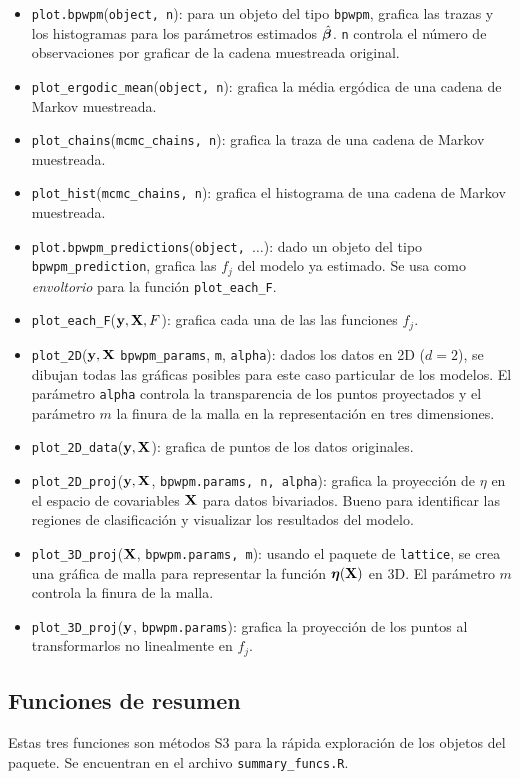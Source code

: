 \documentclass[../../Main/Main.tex]{subfiles}
\begin{document}
\begin{itemize}[label = {}]
	\item \verb|plot.bpwpm|(\verb|object, n|): para un objeto del tipo \verb|bpwpm|, grafica las trazas y los histogramas para los parámetros estimados $\hat{\bm{\beta}}$. \verb|n| controla el número de observaciones por graficar de la cadena muestreada original.
	\item \verb|plot_ergodic_mean|(\verb|object, n|): grafica la média ergódica de una cadena de Markov muestreada.
	\item \verb|plot_chains|(\verb|mcmc_chains, n|): grafica la traza de una cadena de Markov muestreada.
	\item \verb|plot_hist|(\verb|mcmc_chains, n|): grafica el histograma de una cadena de Markov muestreada.  
	\item \verb|plot.bpwpm_predictions|(\verb|object, |$\ldots$): dado un objeto del tipo \verb|bpwpm_prediction|, grafica las $f_j$ del modelo ya estimado. Se usa como \emph{envoltorio} para la función \verb|plot_each_F|. 
	\item \verb|plot_each_F|($\mathbf{y}, \mathbf{X}, F$): grafica cada una de las las funciones $f_j$. 
	\item \verb|plot_2D|($\mathbf{y},\mathbf{X}$ \verb|bpwpm_params|, \verb|m|, \verb|alpha|): dados los datos en 2D ($d = 2$), se dibujan todas las gráficas posibles para este caso particular de los modelos. El parámetro \verb|alpha| controla la transparencia de los puntos proyectados y el parámetro $m$ la finura de la malla en la representación en tres dimensiones.
	\item \verb|plot_2D_data|($\mathbf{y}, \mathbf{X}$): grafica de puntos de los datos originales.
	\item \verb|plot_2D_proj|($\mathbf{y}, \mathbf{X}$, \verb|bpwpm.params, n, alpha|): grafica la proyección de $\eta$ en el espacio de covariables $\mathcal{\mathbf{X}}$ para datos bivariados. Bueno para identificar las regiones de clasificación y visualizar los resultados del modelo.
	\item \verb|plot_3D_proj|($\mathbf{X}$, \verb|bpwpm.params, m|): usando el paquete de \verb|lattice|, se crea una gráfica de malla para representar la función $\bm{\eta}(\mathbf{X})$ en 3D. El parámetro $m$ controla la finura de la malla.
	\item \verb|plot_3D_proj|($\mathbf{y}$, \verb|bpwpm.params|): grafica la proyección de los puntos al transformarlos no linealmente en $f_j$. 
\end{itemize}

\subsection*{Funciones de resumen}
Estas tres funciones son métodos S3 para la rápida exploración de los objetos del paquete. Se encuentran en el archivo \verb|summary_funcs.R|.
\end{document}
